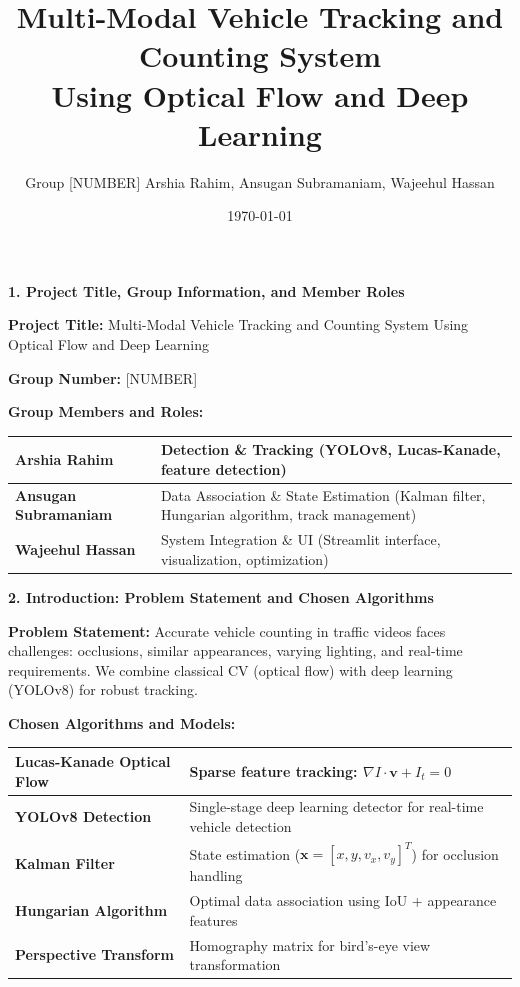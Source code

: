 \documentclass[8pt,a4paper]{article}
\title{\textbf{Multi-Modal Vehicle Tracking and Counting System\\Using Optical Flow and Deep Learning}}
\author{Group [NUMBER] \quad Arshia Rahim, Ansugan Subramaniam, Wajeehul Hassan}
\date{\today}
\begin{document}
\maketitle
\vspace{-0.4cm}

\noindent\textbf{1. Project Title, Group Information, and Member Roles}

\vspace{0.15cm}
\noindent\textbf{Project Title:} Multi-Modal Vehicle Tracking and Counting System Using Optical Flow and Deep Learning

\noindent\textbf{Group Number:} [NUMBER]

\noindent\textbf{Group Members and Roles:}
\begin{table}[h]
\centering
\small
\begin{tabular}{|p{2.5cm}|p{10cm}|}
\hline
\textbf{Arshia Rahim} & Detection \& Tracking (YOLOv8, Lucas-Kanade, feature detection) \\
\hline
\textbf{Ansugan Subramaniam} & Data Association \& State Estimation (Kalman filter, Hungarian algorithm, track management) \\
\hline
\textbf{Wajeehul Hassan} & System Integration \& UI (Streamlit interface, visualization, optimization) \\
\hline
\end{tabular}
\end{table}

\vspace{0.1cm}
\noindent\textbf{2. Introduction: Problem Statement and Chosen Algorithms}

\vspace{0.15cm}
\noindent\textbf{Problem Statement:} Accurate vehicle counting in traffic videos faces challenges: occlusions, similar appearances, varying lighting, and real-time requirements. We combine classical CV (optical flow) with deep learning (YOLOv8) for robust tracking.

\vspace{0.05cm}
\noindent\textbf{Chosen Algorithms and Models:}
\vspace{-0.1cm}
\begin{table}[h]
\centering
\small
\begin{tabular}{|p{4cm}|p{8.5cm}|}
\hline
\textbf{Lucas-Kanade Optical Flow} & Sparse feature tracking: $\nabla I \cdot \mathbf{v} + I_t = 0$ \\
\hline
\textbf{YOLOv8 Detection} & Single-stage deep learning detector for real-time vehicle detection \\
\hline
\textbf{Kalman Filter} & State estimation ($\mathbf{x} = [x, y, v_x, v_y]^T$) for occlusion handling \\
\hline
\textbf{Hungarian Algorithm} & Optimal data association using IoU + appearance features \\
\hline
\textbf{Perspective Transform} & Homography matrix for bird's-eye view transformation \\
\hline
\end{tabular}
\end{table}
\end{document}
